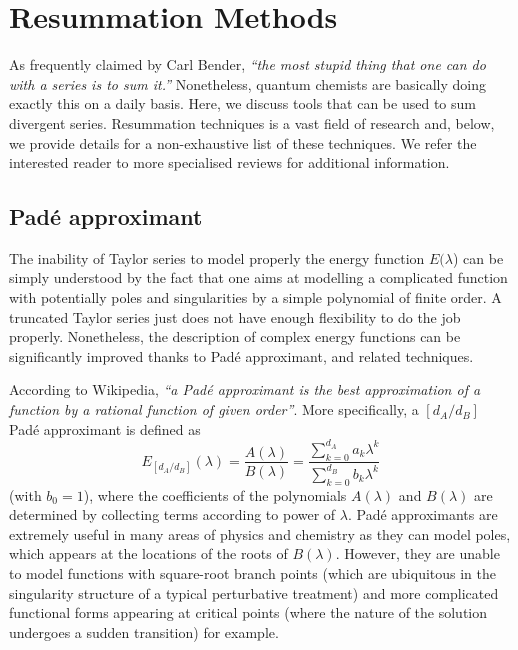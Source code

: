 \documentclass[aps,prb,reprint,noshowkeys,linenumbers,superscriptaddress]{revtex4-1}
\begin{document}
\section{Resummation Methods}
\label{sec:Resummation}

As frequently claimed by Carl Bender, \textit{``the most stupid thing that one can do with a series is to sum it.''}
Nonetheless, quantum chemists are basically doing exactly this on a daily basis.
Here, we discuss tools that can be used to sum divergent series.
Resummation techniques is a vast field of research and, below, we provide details for a non-exhaustive list of these techniques.
We refer the interested reader to more specialised reviews for additional information. \cite{Goodson_2011,Goodson_2019}

\subsection{Pad\'e approximant}
The inability of Taylor series to model properly the energy function $E(\lambda$) can be simply understood by the fact that one aims at modelling a complicated function with potentially poles and singularities by a simple polynomial of finite order.
A truncated Taylor series just does not have enough flexibility to do the job properly.
Nonetheless, the description of complex energy functions can be significantly improved thanks to Pad\'e approximant, \cite{Pade_1892} and related techniques. \cite{BakerBook,BenderBook}

According to Wikipedia, \textit{``a Pad\'e approximant is the best approximation of a function by a rational function of given order''}. 
More specifically, a $[d_A/d_B]$ Pad\'e approximant is defined as 
\begin{equation}
	\label{eq:PadeApp}
	E_{[d_A/d_B]}(\lambda) = \frac{A(\lambda)}{B(\lambda)} = \frac{\sum_{k=0}^{d_A} a_k \lambda^k}{\sum_{k=0}^{d_B} b_k \lambda^k}
\end{equation}
(with $b_0 = 1$), where the coefficients of the polynomials $A(\lambda)$ and $B(\lambda)$ are determined by collecting terms according to power of $\lambda$.
Pad\'e approximants are extremely useful in many areas of physics and chemistry \cite{Loos_2013,Pavlyukh_2017,Tarantino_2019,Gluzman_2020} as they can model poles, which appears at the locations of the roots of $B(\lambda)$. 
However, they are unable to model functions with square-root branch points (which are ubiquitous in the singularity structure of a typical perturbative treatment) and more complicated functional forms appearing at critical points (where the nature of the solution undergoes a sudden transition) for example.
\end{document}
